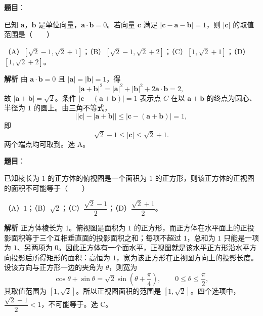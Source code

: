 \begin{answer}

\textbf{题目}：

已知 $\boldsymbol a$，$\boldsymbol b$ 是单位向量，$\boldsymbol a\cdot\boldsymbol b=0$。若向量 $\boldsymbol c$ 满足 $|\boldsymbol c-\boldsymbol a-\boldsymbol b|=1$，则 $|\boldsymbol c|$ 的取值范围是\mbox{（　　）}

（A）$[\sqrt2-1,\sqrt2+1]$；（B）$[\sqrt2-1,\sqrt2+2]$；（C）$[1,\sqrt2+1]$；（D）$[1,\sqrt2+2]$。

\textbf{解析}
由 $\boldsymbol a\cdot\boldsymbol b=0$ 且 $|\boldsymbol a|=|\boldsymbol b|=1$，得
\nopagebreak[4]
\[|\boldsymbol a+\boldsymbol b|^2=|\boldsymbol a|^2+|\boldsymbol b|^2+2\boldsymbol a\cdot\boldsymbol b=2,\]
故 $|\boldsymbol a+\boldsymbol b|=\sqrt2$。条件 $|\boldsymbol c-(\boldsymbol a+\boldsymbol b)|=1$ 表示点 $C$ 在以 $\boldsymbol a+\boldsymbol b$ 的终点为圆心、半径为 $1$ 的圆上。由三角不等式，
\nopagebreak[4]
\[\bigl||\boldsymbol c|-|\boldsymbol a+\boldsymbol b|\bigr|\leqslant|\boldsymbol c-(\boldsymbol a+\boldsymbol b)|=1,\]
即
\nopagebreak[4]
\[\sqrt2-1\leqslant|\boldsymbol c|\leqslant\sqrt2+1.\]
两个端点均可取到。选 A。


\end{answer}
\begin{answer}

\textbf{题目}：

已知棱长为 $1$ 的正方体的俯视图是一个面积为 $1$ 的正方形，则该正方体的正视图的面积不可能等于\mbox{（　　）}

（A）$1$；（B）$\sqrt2$；（C）$\dfrac{\sqrt2-1}{2}$；（D）$\dfrac{\sqrt2+1}{2}$。

\textbf{解析}
正方体棱长为 $1$。俯视图是面积为 $1$ 的正方形，而正方体在水平面上的正投影面积等于三个互相垂直面的投影面积之和；每项不超过 $1$，总和为 $1$ 只能是一项为 $1$、另两项为 $0$。因此正方体有一个面水平，正视图就是该水平正方形沿水平方向投影后所得矩形的面积：高恒为 $1$，宽为该正方形在正视图方向上的投影长度。设该方向与正方形一边的夹角为 $\theta$，则宽为
\nopagebreak[4]
\[\cos\theta+\sin\theta=\sqrt2\sin\left(\theta+\frac\pi4\right),\qquad 0\leqslant\theta\leqslant\frac\pi2,\]
其取值范围为 $[1,\sqrt2]$。所以正视图面积的范围是 $[1,\sqrt2]$。四个选项中，$\dfrac{\sqrt2-1}{2}<1$，不可能等于。选 C。


\end{answer}
